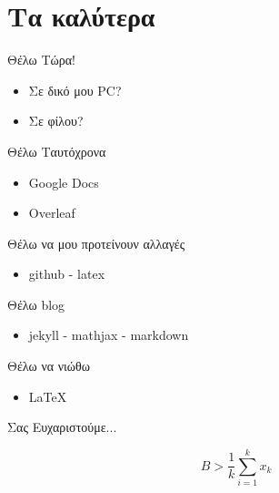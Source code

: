 \documentclass[greek]{beamer}
\begin{document}
\section{Τα καλύτερα}
\begin{frame}{Θέλω Τώρα!}
  \begin{itemize}
    \item Σε δικό μου PC?
    \item Σε φίλου?
  \end{itemize}
\end{frame}

\begin{frame}{Θέλω Ταυτόχρονα}
  \begin{itemize}
    \item Google Docs
    \item Overleaf
  \end{itemize}
\end{frame}

\begin{frame}{Θέλω να μου προτείνουν αλλαγές}
  \begin{itemize}
    \item github - latex
  \end{itemize}
\end{frame}

\begin{frame}{Θέλω blog}
  \begin{itemize}
    \item jekyll - mathjax - markdown
  \end{itemize}
\end{frame}

\begin{frame}{Θέλω να νιώθω}
  \begin{itemize}
    \item \LaTeX
  \end{itemize}
\end{frame}

\begin{frame}[plain,c]
  \begin{center}
    \Huge Σας Ευχαριστούμε...
  \end{center}
  $$B > \frac{1}{k}\sum_{i=1}^{k}x_k$$
\end{frame}
\end{document}
